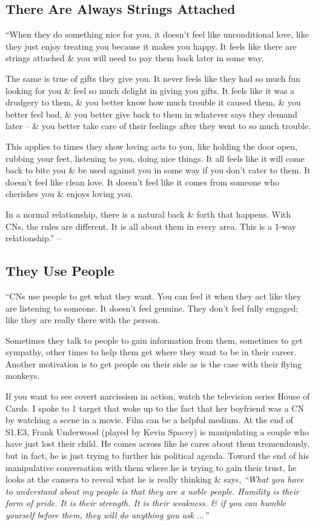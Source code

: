 \documentclass{article}
\numberwithin{equation}{section}
\begin{document}
\subsection{There Are Always Strings Attached}
``When they do something nice for you, it doesn't feel like unconditional love, like they just enjoy treating you because it makes you happy. It feels like there are strings attached \& you will need to pay them back later in some way.

The same is true of gifts they give you. It never feels like they had so much fun looking for you \& feel so much delight in giving you gifts. It feels like it was a drudgery to them, \& you better know how much trouble it caused them, \& you better feel bad, \& you better give back to them in whatever says they demand later -- \& you better take care of their feelings after they went to so much trouble.

This applies to times they show loving acts to you, like holding the door open, rubbing your feet, listening to you, doing nice things. It all feels like it will come back to bite you \& be used against you in some way if you don't cater to them. It doesn't feel like clean love. It doesn't feel like it comes from someone who cherishes you \& enjoys loving you.

In a normal relationship, there is a natural back \& forth that happens. With CNs, the rules are different. It is all about them in every area. This is a 1-way relationship.'' -- \cite[pp. 66--67]{Mirza2017}

\subsection{They Use People}
``CNs use people to get what they want. You can feel it when they act like they are listening to someone. It doesn't feel genuine. They don't feel fully engaged; like they are really there with the person.

Sometimes they talk to people to gain information from them, sometimes to get sympathy, other times to help them get where they want to be in their career. Another motivation is to get people on their side as is the case with their flying monkeys.

If you want to see covert narcissism in action, watch the television series House of Cards. I spoke to 1 target that woke up to the fact that her boyfriend was a CN by watching a scene in a movie. Film can be a helpful medium. At the end of S1.E3, Frank Underwood (played by Kevin Spacey) is manipulating a couple who have just lost their child. He comes across like he cares about them tremendously, but in fact, he is just trying to further his political agenda. Toward the end of his manipulative conversation with them where he is trying to gain their trust, he looks at the camera to reveal what he is really thinking \& says, \textit{``What you have to understand about my people is that they are a noble people. Humility is their form of pride. It is their strength. It is their weakness. \& if you can humble yourself before them, they will do anything you ask $\ldots$''}
\end{document}
